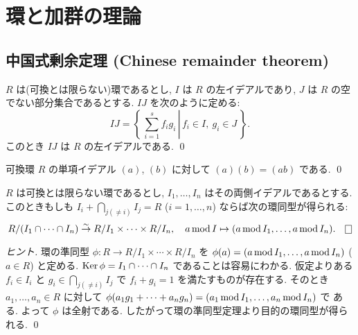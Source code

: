 \documentclass[12pt,twoside]{jarticle}
\begin{document}
\setcounter{section}{1}

\section{環と加群の理論}

\setcounter{subsection}{5}

\subsection{中国式剰余定理 (Chinese remainder theorem)}

\begin{question}
 $R$ は(可換とは限らない)環であるとし, $I$ は $R$ の左イデアルであり, 
 $J$ は $R$ の空でない部分集合であるとする. $IJ$ を次のように定める:
 \begin{equation*}
  IJ = 
  \left\{\,\left. \sum_{i=1}^s f_ig_i 
  \,\right|\, f_i\in I,\ g_i\in J \,\right\}.
 \end{equation*}
 このとき $IJ$ は $R$ の左イデアルである. \qed
\end{question}

\begin{question}[易しい]
 可換環 $R$ の単項イデアル $(a)$, $(b)$ に対して $(a)(b)=(ab)$ である.
 \qed
\end{question}

\begin{question}[可換とは限らない環に関する中国式剰余定理]
 $R$ は可換とは限らない環であるとし, 
 $I_1,\ldots,I_n$ はその両側イデアルであるとする.
 このときもしも $I_i+\bigcap_{j(\ne i)}I_j=R$ ($i=1,\ldots,n$) 
 ならば次の環同型が得られる:
 \begin{equation*}
  R/(I_1\cap\cdots\cap I_n) \isomto R/I_1\times\cdots\times R/I_n,
  \quad
  a\MOD I \mapsto (a\MOD I_1,\ldots,a\MOD I_n).
  \qed
 \end{equation*}
\end{question}

\begin{proof}[ヒント]
 環の準同型 $\phi:R\to R/I_1\times\cdots\times R/I_n$ 
 を $\phi(a)=(a\mathop{\mathrm{mod}}\nolimits I_1,\ldots,a\mathop{\mathrm{mod}}\nolimits I_n)$ ($a\in R$) と定める.
 $\mathop{\mathrm{Ker}}\nolimits\phi=I_1\cap\cdots\cap I_n$ であることは容易にわかる.
 仮定よりある $f_i\in I_i$ と $g_i\in \bigcap_{j(\ne i)}I_j$ 
 で $f_i+g_i=1$ を満たすものが存在する. 
 そのとき $a_1,\ldots,a_n\in R$ に対して %
 $\phi(a_1g_1+\cdots+a_ng_n)=(a_1\mathop{\mathrm{mod}}\nolimits I_1,\ldots,a_n\mathop{\mathrm{mod}}\nolimits I_n)$ で
 ある. よって $\phi$ は全射である.
 したがって環の準同型定理より目的の環同型が得られる.
 \qed
\end{proof}
\end{document}

